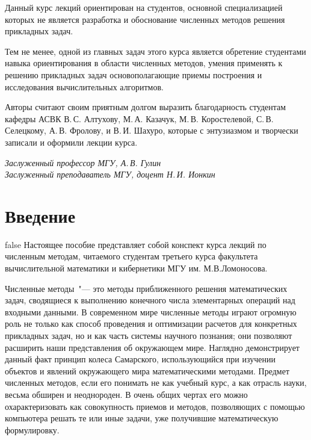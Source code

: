 \documentclass[11pt,a4paper,twoside]{report}
\numberwithin{equation}{section}
\theoremstyle{definition}
\theoremstyle{plain}
\begin{document}
Данный курс лекций ориентирован на студентов, основной специализацией которых
не является разработка и обоснование численных методов решения прикладных
задач.

Тем не менее, одной из главных задач этого курса является обретение
студентами навыка ориентирования в области численных методов, умения применять
к решению прикладных задач основополагающие приемы построения и исследования
вычислительных алгоритмов.

Авторы считают своим приятным долгом выразить благодарность студентам кафедры
АСВК В.\,С. Алтухову, М.\,А. Казачук, М.\,В. Коростелевой, С.\,В. Селецкому,
А.\,В. Фролову, и В.\,И. Шахуро, которые с энтузиазмом и творчески записали
и оформили лекции курса.

\begin{flushright}
    \textit{Заслуженный профессор МГУ, А.\,В. Гулин}\\
    \textit{Заслуженный преподаватель МГУ, доцент Н.\,И. Ионкин}\\
\end{flushright}

%
\newpage
{}
\pagestyle{empty}
%
\chapter*{Введение}
%
\vspace{0.5cm}
\ifx false
Настоящее пособие представляет собой конспект курса лекций по численным
методам, читаемого студентам третьего курса факультета вычислительной
математики и кибернетики МГУ им. М.В.Ломоносова.

Численные методы~"--- это методы приближенного решения математических задач,
сводящиеся к выполнению конечного числа элементарных операций над входными
данными.  В современном мире численные методы играют огромную роль не только
как способ проведения и оптимизации расчетов для конкретных прикладных задач,
но и как часть системы научного познания; они позволяют расширить наши представления
об окружающем мире. Наглядно демонстрирует данный факт принцип колеса Самарского,
использующийся при изучении объектов и явлений окружающего мира математическими
методами.
\fi
Предмет численных методов, если его понимать не как учебный курс, а как отрасль
науки, весьма обширен и неоднороден. В очень общих чертах его можно охарактеризовать
как совокупность приемов и методов, позволяющих с помощью компьютера решать те или
иные задачи, уже получившие математическую формулировку.
\end{document}
